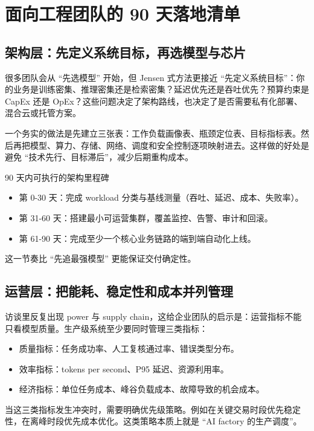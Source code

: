 \section{面向工程团队的 90 天落地清单}

\subsection{架构层：先定义系统目标，再选模型与芯片}

很多团队会从 ``先选模型'' 开始，但 Jensen 式方法更接近 ``先定义系统目标''：你的业务是训练密集、推理密集还是检索密集？延迟优先还是吞吐优先？预算约束是 CapEx 还是 OpEx？这些问题决定了架构路线，也决定了是否需要私有化部署、混合云或托管方案。

一个务实的做法是先建立三张表：工作负载画像表、瓶颈定位表、目标指标表。然后再把模型、算力、存储、网络、调度和安全控制逐项映射进去。这样做的好处是避免 ``技术先行、目标滞后''，减少后期重构成本。

\begin{importantbox}{90 天内可执行的架构里程碑}
\begin{itemize}
    \item 第 0-30 天：完成 workload 分类与基线测量（吞吐、延迟、成本、失败率）。
    \item 第 31-60 天：搭建最小可运营集群，覆盖监控、告警、审计和回滚。
    \item 第 61-90 天：完成至少一个核心业务链路的端到端自动化上线。
\end{itemize}
这一节奏比 ``先追最强模型'' 更能保证交付确定性。
\end{importantbox}

\subsection{运营层：把能耗、稳定性和成本并列管理}

访谈里反复出现 power 与 supply chain，这给企业团队的启示是：运营指标不能只看模型质量。生产级系统至少要同时管理三类指标：
\begin{itemize}
    \item 质量指标：任务成功率、人工复核通过率、错误类型分布。
    \item 效率指标：tokens per second、P95 延迟、资源利用率。
    \item 经济指标：单位任务成本、峰谷负载成本、故障导致的机会成本。
\end{itemize}

当这三类指标发生冲突时，需要明确优先级策略。例如在关键交易时段优先稳定性，在离峰时段优先成本优化。这类策略本质上就是 ``AI factory 的生产调度''。

